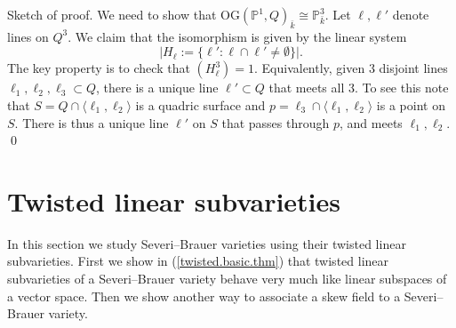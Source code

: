\documentclass{amsart}
\theoremstyle{definition}
\theoremstyle{remark}
\newcommand{\p}[0]{{\mathbb P}}
\newcommand{\OG}{\mathrm{OG}}
\begin{document}
Sketch of proof. We need to show that $\OG(\p^1, Q)_{\bar k}\cong \p^3_{\bar k}$.
Let $\ell, \ell'$ denote lines on $Q^3$.
We claim that the isomorphism is given by the linear system
$$
\bigl|H_{\ell} :=\{\ell': \ell\cap\ell'\neq \emptyset\}\bigr|.
$$
The key property is to check that $(H_{\ell}^3)=1$. Equivalently,
given 3 disjoint lines $\ell_1,\ell_2,\ell_3\subset Q$, there is a unique line
$\ell'\subset Q$ that meets all 3. To see this note that 
$S=Q\cap \langle \ell_1, \ell_2\rangle$ is a quadric surface
and $p=\ell_3\cap \langle \ell_1, \ell_2\rangle$ is  a point on $S$.
There is thus a unique line $\ell'$ on $S$ that passes through $p$, and
meets  $ \ell_1, \ell_2$. \qed 




\section{Twisted linear subvarieties}\label{sec.2}

In this section we  study 
Severi--Brauer varieties using their twisted linear subvarieties.
First we show in (\ref{twisted.basic.thm})   that  twisted linear subvarieties of a Severi--Brauer variety behave very much like linear subspaces of a  vector space.
Then we show another way  to associate a skew field  to a 
Severi--Brauer variety.
\end{document}
